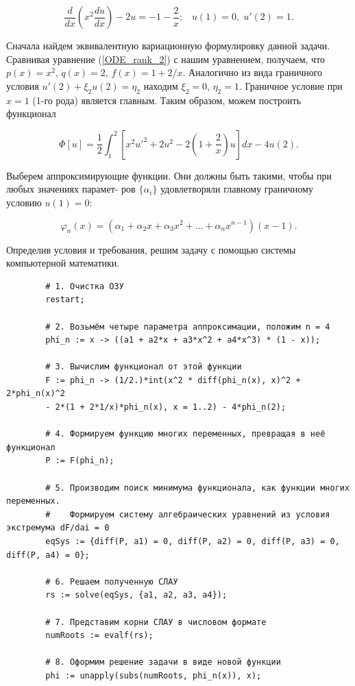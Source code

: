 \documentclass{article}
\begin{document}
\begin{displaymath}
	\frac{d}{dx} \left( x^{2} \frac{du}{dx} \right) - 2u = -1 - \frac{2}{x}; \; \; \; u(1) = 0, \; u'(2) = 1.
\end{displaymath}

Сначала найдем эквивалентную вариационную формулировку данной задачи. Сравнивая уравнение (\ref{ODE_rank_2}) с нашим уравнением, получаем, что $p(x) = x^{2}$, $q(x) = 2$, $f(x) = 1 + 2/x$. Аналогично из вида граничного условия $u'(2) + \xi_{2} u(2) = \eta_{2}$ находим $\xi_{2} = 0$, $\eta_{2} = 1$. Граничное условие при $x = 1$ (1-го рода) является главным. Таким образом, можем построить функционал

\begin{displaymath}
	\Phi[u] = \frac{1}{2} \int_{1}^{2} \left[ x^{2} u'^{2} + 2 u^{2} - 2 \left( 1 + \frac{2}{x} \right) u \right] dx - 4 u(2).
\end{displaymath}

Выберем аппроксимирующие функции. Они должны быть такими, чтобы при любых значениях парамет-
ров $\{\alpha_{i}\}$ удовлетворяли главному граничному условию $u(1) = 0$:

\begin{displaymath}
	\varphi_{n}(x) = (\alpha_{1} + \alpha_{2}x + \alpha_{3}x^{2} + \dots + \alpha_{n}x^{n-1}) (x-1).
\end{displaymath}

Определив условия и требования, решим задачу с помощью системы компьютерной математики.

\begin{commandline}
	\begin{verbatim}
		# 1. Очистка ОЗУ
		restart;		
		
		# 2. Возьмём четыре параметра аппроксимации, положим n = 4
		phi_n := x -> ((a1 + a2*x + a3*x^2 + a4*x^3) * (1 - x));	
		
		# 3. Вычислим функционал от этой функции
		F := phi_n -> (1/2.)*int(x^2 * diff(phi_n(x), x)^2 + 2*phi_n(x)^2
		- 2*(1 + 2*1/x)*phi_n(x), x = 1..2) - 4*phi_n(2);
		
		# 4. Формируем функцию многих переменных, превращая в неё функционал
		P := F(phi_n);	
		
		# 5. Производим поиск минимума функционала, как функции многих переменных.
		#    Формируем систему алгебраических уравнений из условия экстремума dF/dai = 0
		eqSys := {diff(P, a1) = 0, diff(P, a2) = 0, diff(P, a3) = 0, diff(P, a4) = 0};
		
		# 6. Решаем полученную СЛАУ
		rs := solve(eqSys, {a1, a2, a3, a4});
		
		# 7. Представим корни СЛАУ в числовом формате
		numRoots := evalf(rs);
		
		# 8. Оформим решение задачи в виде новой функции
		phi := unapply(subs(numRoots, phi_n(x)), x);
	\end{verbatim}
\end{commandline}
\end{document}
